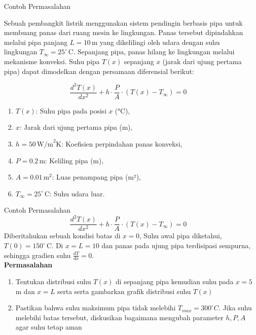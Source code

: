 \documentclass[xcolor={dvipsnames}, 9pt]{beamer}
\begin{document}
	\begin{frame}{Contoh Permasalahan}
		
		Sebuah pembangkit listrik menggunakan sistem pendingin berbasis pipa untuk membuang panas dari ruang mesin ke lingkungan. Panas tersebut dipindahkan melalui pipa panjang \( L = 10 \, \text{m} \) yang dikelilingi oleh udara dengan suhu lingkungan \( T_\infty = 25^\circ \, \text{C} \). Sepanjang pipa, panas hilang ke lingkungan melalui mekanisme konveksi. Suhu pipa \( T(x) \) sepanjang \( x \) (jarak dari ujung pertama pipa) dapat dimodelkan dengan persamaan diferensial berikut:
		
		\[
		\frac{d^2T(x)}{dx^2} + h \cdot \frac{P}{A} \cdot (T(x) - T_\infty) = 0
		\]
		
		\begin{enumerate}
			\item \( T(x) \): Suhu pipa pada posisi \( x \) (°C),
			\item \( x \): Jarak dari ujung pertama pipa (m),
			\item \( h = 50 \, \text{W/m}^2\text{K} \): Koefisien perpindahan panas konveksi,
			\item \( P = 0.2 \, \text{m} \): Keliling pipa (m),
			\item \( A = 0.01 \, \text{m}^2 \): Luas penampang pipa (m²),
			\item \( T_\infty = 25^\circ \, \text{C} \): Suhu udara luar.
			
		\end{enumerate}
	\end{frame}
	
	\begin{frame}{Contoh Permasalahan}
		\[
		\frac{d^2T(x)}{dx^2} + h \cdot \frac{P}{A} \cdot (T(x) - T_\infty) = 0
		\]
		Diberitahukan sebuah kondisi batas di $x=0$, Suhu awal pipa diketahui, \( T(0) = 150^\circ \, \text{C} \). Di $x=L=10$ dan panas pada ujung pipa terdisipasi sempurna, sehingga gradien suhu \( \frac{dT}{dx} = 0 \).
		\vspace{1 cm}\\
		\textbf{Permasalahan}
		\begin{enumerate}
			\item Tentukan distribusi suhu $T(x)$ di sepanjang pipa kemudian suhu pada $x=5$m dan $x=L$ serta serta gambarkan grafik distribusi suhu $T(x)$
			\item Pastikan bahwa suhu maksimum pipa tidak melebihi $T_{max} = 300^{\circ} C$. Jika suhu melebihi batas tersebut, diskusikan bagaimana mengubah parameter $h, P, A$ agar suhu tetap aman
		\end{enumerate}
		
	\end{frame}
	
\end{document}
